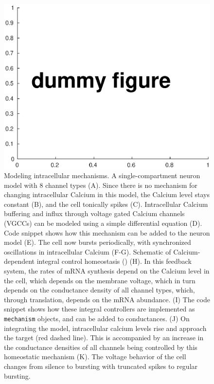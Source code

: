 \documentclass{frontiersSCNS} %
\begin{document}
\begin{figure}[!htb]
	\centering
	\includegraphics[width=1.0\linewidth]{gfx/figure_mechanism}
	\caption{Modeling intracellular mechanisms. A single-compartment neuron model with 8 channel types (A). Since there is no mechanism for changing intracellular Calcium in this model, the Calcium level stays constant (B), and the cell tonically spikes (C). Intracellular Calcium buffering and influx through voltage gated Calcium channels (VGCCs) can be modeled using a simple differential equation (D). Code snippet shows how this mechanism can be added to the neuron model (E). The cell now bursts periodically, with synchronized oscillations in intracellular Calcium (F-G). Schematic of Calcium-dependent integral control homeostasis (\cite{olearyCorrelationsIonChannel2013, olearyCellTypesNetwork2014}) (H). In this feedback system, the rates of mRNA synthesis depend on the Calcium level in the cell, which depends on the membrane voltage, which in turn depends on the conductance density of all channel types, which, through translation, depends on the mRNA abundance. (I) The code snippet shows how these integral controllers are implemented as \texttt{mechanism} objects, and can be added to conductances. (J) On integrating the model, intracellular calcium levels rise and approach the target (red dashed line). This is accompanied by an increase in the conductance densities of all channels being controlled by this homeostatic mechanism (K). The voltage behavior of the cell changes from silence to bursting with truncated spikes to regular bursting.}
	\label{fig:figuremechanism}
\end{figure}
\end{document}
